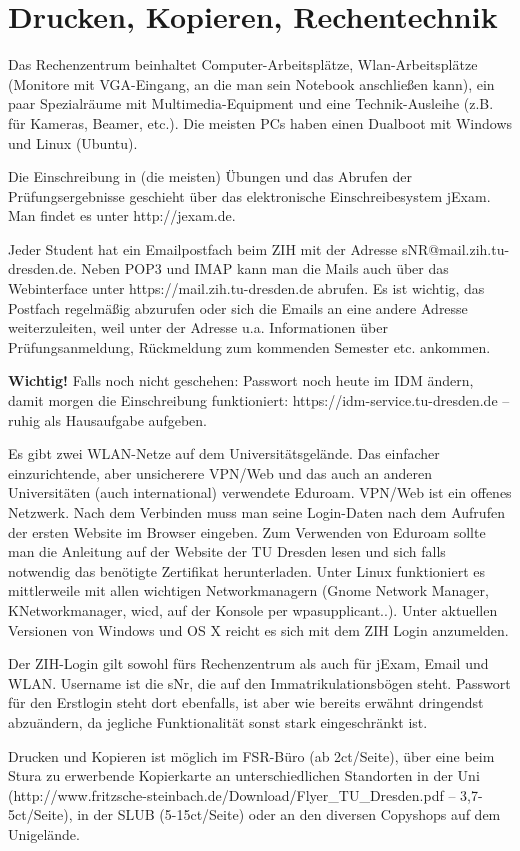 \documentclass[a4paper,12pt]{report}
\begin{document}
\section{Drucken, Kopieren, Rechentechnik}
\begin{itemize*}
	\item Das Rechenzentrum beinhaltet Computer-Arbeitsplätze, Wlan-Arbeitsplätze (Monitore mit VGA-Eingang, an die man sein Notebook anschließen kann), ein paar Spezialräume mit Multimedia-Equipment und eine Technik-Ausleihe (z.B. für Kameras, Beamer, etc.).
	Die meisten PCs haben einen Dualboot mit Windows und Linux (Ubuntu).
	\item Die Einschreibung in (die meisten) Übungen und das Abrufen der Prüfungsergebnisse geschieht über das elektronische Einschreibesystem jExam.
	Man findet es unter http://jexam.de.
	\item Jeder Student hat ein Emailpostfach beim ZIH mit der Adresse sNR@mail.zih.tu-dresden.de.
	Neben POP3 und IMAP kann man die Mails auch über das Webinterface unter https://mail.zih.tu-dresden.de abrufen.
	Es ist wichtig, das Postfach regelmäßig abzurufen oder sich die Emails an eine andere Adresse weiterzuleiten, weil unter der Adresse u.a. Informationen über Prüfungsanmeldung, Rückmeldung zum kommenden Semester etc. ankommen.
	\item \textbf{Wichtig!} Falls noch nicht geschehen: Passwort noch heute im IDM ändern, damit morgen die Einschreibung funktioniert: https://idm-service.tu-dresden.de -- ruhig als Hausaufgabe aufgeben.
	\item Es gibt zwei WLAN-Netze auf dem Universitätsgelände.
	Das einfacher einzurichtende, aber unsicherere VPN/Web und das auch an anderen Universitäten (auch international) verwendete Eduroam.
	VPN/Web ist ein offenes Netzwerk.
	Nach dem Verbinden muss man seine Login-Daten nach dem Aufrufen der ersten Website im Browser eingeben.
	Zum Verwenden von Eduroam sollte man die Anleitung auf der Website der TU Dresden lesen und sich falls notwendig das benötigte Zertifikat herunterladen.
	Unter Linux funktioniert es mittlerweile mit allen wichtigen Networkmanagern (Gnome Network Manager, KNetworkmanager, wicd, auf der Konsole per wpasupplicant..).
	Unter aktuellen Versionen von Windows und OS X reicht es sich mit dem ZIH Login anzumelden.
	\item Der ZIH-Login gilt sowohl fürs Rechenzentrum als auch für jExam, Email und WLAN.
	Username ist die \glqq sNr\grqq, die auf den Immatrikulationsbögen steht.
	Passwort für den Erstlogin steht dort ebenfalls, ist aber wie bereits erwähnt dringendst abzuändern, da jegliche Funktionalität sonst stark eingeschränkt ist.
	\item Drucken und Kopieren ist möglich im FSR-Büro (ab 2ct/Seite), über eine beim Stura zu erwerbende Kopierkarte an unterschiedlichen Standorten in der Uni (http://www.fritzsche-steinbach.de/Download/Flyer\_TU\_Dresden.pdf -- 3,7-5ct/Seite), in der SLUB (5-15ct/Seite) oder an den diversen Copyshops auf dem Unigelände.
\end{itemize*}
\end{document}
